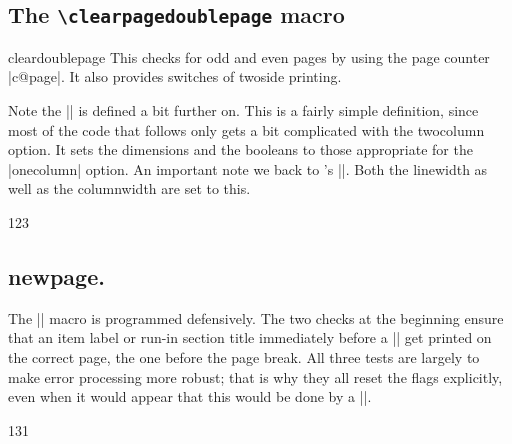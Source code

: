 \subsection{The \texttt{\textbackslash clearpagedoublepage} macro} 

\begin{macro}{cleardoublepage}
This checks for odd and even pages by using the
page counter |c@page|.  It also provides switches of twoside printing. 

\begin{teXXX}
\def\cleardoublepage{%
   \clearpage
   \if@twoside 
     \ifodd\c@page
     \else
       \hbox{}
       \newpage
       \if@twocolumn\hbox{}\newpage
       \fi
     \fi
  \fi}
\end{teXXX}
\end{macro}

Note the |\newpage| is defined a bit further on. This is a fairly simple definition, since most of the code that follows only gets a bit complicated with the twocolumn option. It sets the dimensions and the booleans to those appropriate for the |onecolumn| option. An important note we back to \tex's |\hsize|. Both the linewidth as well as the columnwidth are set to this.

\begin{teXXX}
123 \def\onecolumn{%
124   \clearpage
125   \global\columnwidth\textwidth
126   \global\hsize\columnwidth
127   \global\linewidth\columnwidth
128   \global\@twocolumnfalse
129   \col@number \@ne
130   \@floatplacement
     }
\end{teXXX}

\subsection{\string newpage.} 

The |\newpage| macro is programmed defensively. The two checks at the beginning ensure that an item label or run-in section title
immediately before a |\newpage| get printed on the correct page, the one before
the page break.
All three tests are largely to make error processing more robust; that is why
they all reset the 
flags explicitly, even when it would appear that this would be
done by a |\leavevmode|.

\begin{teXXX}
131 \def \newpage {%
132  \if@noskipsec
133    \ifx \@nodocument\relax
134      \leavevmode
135      \global \@noskipsecfalse
136    \fi
137 \fi
138 \if@inlabel
139   \leavevmode
140   \global \@inlabelfalse
141 \fi
142 \if@nobreak \@nobreakfalse \everypar{}\fi
143 \par
144 \vfil
145 \penalty -\@M}
\end{teXXX}

